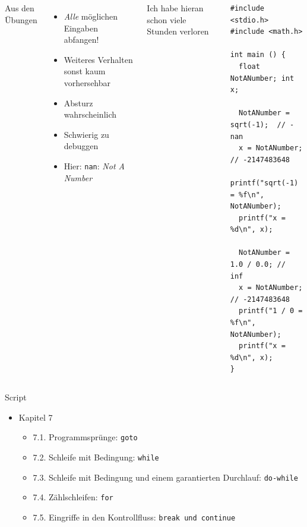 
\begin{frame}[fragile]
%
\begin{columns}[T]
\begin{Large}
{Aus den Übungen}
\vspace{6pt}
\end{Large}
%
\begin{itemize}
\item \emph{Alle} möglichen Eingaben abfangen!
\item Weiteres Verhalten sonst kaum vorhersehbar
\item Absturz wahrscheinlich
\item Schwierig zu debuggen
\item Hier: \texttt{nan}: \emph{Not A Number}
\end{itemize}
\begin{warnbox}
Ich habe hieran schon viele Stunden verloren
\end{warnbox}
%
\begin{codebox}
\begin{verbatim}
#include <stdio.h>
#include <math.h>

int main () {
  float NotANumber; int x;
	
  NotANumber = sqrt(-1);  // -nan
  x = NotANumber;         // -2147483648
  printf("sqrt(-1) = %f\n", NotANumber);
  printf("x = %d\n", x);

  NotANumber = 1.0 / 0.0; //  inf
  x = NotANumber;         // -2147483648
  printf("1 / 0 = %f\n", NotANumber);
  printf("x = %d\n", x);
}
\end{verbatim}
\end{codebox}
\end{columns}
%
\end{frame}


\begin{frame}{Script}
%
\begin{itemize}
\item Kapitel 7
	\begin{itemize}
	\item 7.1. Programmsprünge: \texttt{goto}
	\item 7.2. Schleife mit Bedingung: \texttt{while}
	\item 7.3. Schleife mit Bedingung und einem garantierten Durchlauf: \texttt{do-while}
	\item 7.4. Zählschleifen: \texttt{for}
	\item 7.5. Eingriffe in den Kontrollfluss: \texttt{break und continue}
	\end{itemize}
\end{itemize}
%
\end{frame}

